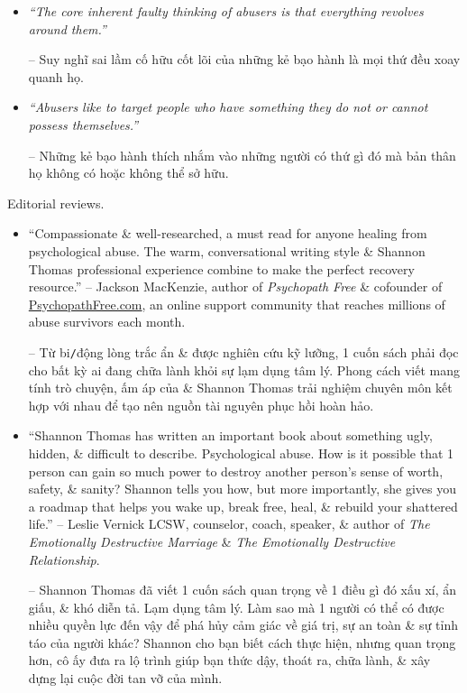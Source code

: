 \documentclass{article}
\begin{document}
\begin{enumerate}
\begin{itemize}
		-- Những kẻ bạo hành tâm lý không chịu trách nhiệm về hành động của mình nên việc đó phải đổ lên người khác.

		\item {\it``The core inherent faulty thinking of abusers is that everything revolves around them.''}

		-- Suy nghĩ sai lầm cố hữu cốt lõi của những kẻ bạo hành là mọi thứ đều xoay quanh họ.

		\item {\it``Abusers like to target people who have something they do not or cannot possess themselves.''}

		-- Những kẻ bạo hành thích nhắm vào những người có thứ gì đó mà bản thân họ không có hoặc không thể sở hữu.
	\end{itemize}
	{\sf Editorial reviews.}
	\begin{itemize}
		\item ``Compassionate \& well-researched, a must read for anyone healing from psychological abuse. The warm, conversational writing style \& {\sc Shannon Thomas} professional experience combine to make the perfect recovery resource.'' -- {\sc Jackson MacKenzie}, author of {\it Psychopath Free} \& cofounder of \url{PsychopathFree.com}, an online support community that reaches millions of abuse survivors each month.

		-- Từ bi{\tt/}động lòng trắc ẩn \& được nghiên cứu kỹ lưỡng, 1 cuốn sách phải đọc cho bất kỳ ai đang chữa lành khỏi sự lạm dụng tâm lý. Phong cách viết mang tính trò chuyện, ấm áp của \& {\sc Shannon Thomas} trải nghiệm chuyên môn kết hợp với nhau để tạo nên nguồn tài nguyên phục hồi hoàn hảo.

		\item ``{\sc Shannon Thomas} has written an important book about something ugly, hidden, \& difficult to describe. Psychological abuse. How is it possible that 1 person can gain so much power to destroy another person's sense of worth, safety, \& sanity? {\sc Shannon} tells you how, but more importantly, she gives you a roadmap that helps you wake up, break free, heal, \& rebuild your shattered life.'' -- {\sc Leslie Vernick LCSW}, counselor, coach, speaker, \& author of {\it The Emotionally Destructive Marriage} \& {\it The Emotionally Destructive Relationship}.

		-- {\sc Shannon Thomas} đã viết 1 cuốn sách quan trọng về 1 điều gì đó xấu xí, ẩn giấu, \& khó diễn tả. Lạm dụng tâm lý. Làm sao mà 1 người có thể có được nhiều quyền lực đến vậy để phá hủy cảm giác về giá trị, sự an toàn \& sự tỉnh táo của người khác? {\sc Shannon} cho bạn biết cách thực hiện, nhưng quan trọng hơn, cô ấy đưa ra lộ trình giúp bạn thức dậy, thoát ra, chữa lành, \& xây dựng lại cuộc đời tan vỡ của mình.


\end{itemize}
\end{enumerate}
\end{document}
